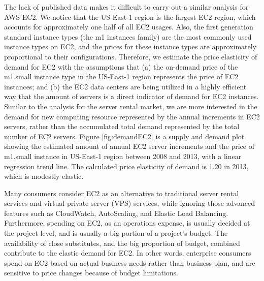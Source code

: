 \documentclass[10pt,journal,cspaper,compsoc]{IEEEtran}
\begin{document}
The lack of published data makes it difficult to carry out a similar analysis for AWS EC2. We notice that the US-East-1 region is the largest EC2 region, which accounts for approximately one half of all EC2 usages. Also, the first generation standard instance types (the m1 instances family) are the most commonly used instance types on EC2, and the prices for these instance types are approximately proportional to their configurations. Therefore, we estimate the price elasticity of demand for EC2 with the assumptions that (a) the on-demand price of the m1.small instance type in the US-East-1 region represents the price of EC2 instances; and (b) the EC2 data centers are being utilized in a highly efficient way that the amount of servers is a direct indicator of demand for EC2 instances. Similar to the analysis for the server rental market, we are more interested in the demand for new computing resource represented by the annual increments in EC2 servers, rather than the accumulated total demand represented by the total number of EC2 servers. Figure \ref{fig:demandEC2} is a supply and demand plot showing the estimated amount of annual EC2 server increments and the price of m1.small instance in US-East-1 region between 2008 and 2013, with a linear regression trend line. The calculated price elasticity of demand is 1.20 in 2013, which is modestly elastic.

Many consumers consider EC2 as an alternative to traditional server rental services and virtual private server (VPS) services, while ignoring those advanced features such as CloudWatch, AutoScaling, and Elastic Load Balancing. Furthermore, spending on EC2, as an operations expense, is usually decided at the project level, and is usually a big portion of a project's budget. The availability of close substitutes, and the big proportion of budget, combined contribute to the elastic demand for EC2. In other words, enterprise consumers spend on EC2 based on actual business needs rather than business plan, and are sensitive to price changes because of budget limitations.
\end{document}

